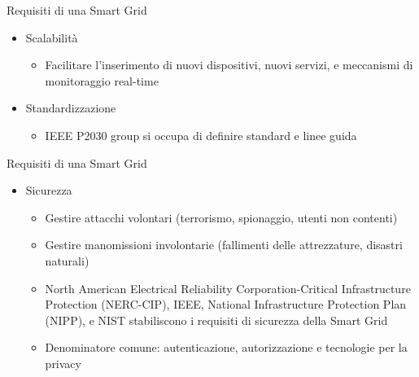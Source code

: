 \begin{frame}{Requisiti di una Smart Grid}
\begin{itemize}[<+- | alert@+>]
\item Scalabilità
	\begin{itemize}
		\item Facilitare l’inserimento di nuovi dispositivi, nuovi servizi, e meccanismi di monitoraggio real-time
	\end{itemize}
\item Standardizzazione
	\begin{itemize}
		\item IEEE P2030 group si occupa di definire standard e linee guida
	\end{itemize}
\end{itemize}
\end{frame}

\begin{frame}{Requisiti di una Smart Grid}
\begin{itemize}[<+- | alert@+>]
\item Sicurezza
	\begin{itemize}
		\item Gestire attacchi volontari (terrorismo, spionaggio, utenti non contenti)
		\item Gestire manomissioni involontarie (fallimenti delle attrezzature, disastri naturali)
		\item North American Electrical Reliability Corporation-Critical Infrastructure Protection (NERC-CIP), IEEE, National Infrastructure Protection Plan (NIPP), e NIST stabiliscono i requisiti di sicurezza della Smart Grid
		\item Denominatore comune: autenticazione, autorizzazione e tecnologie per la privacy
	\end{itemize}
\end{itemize}
\end{frame}